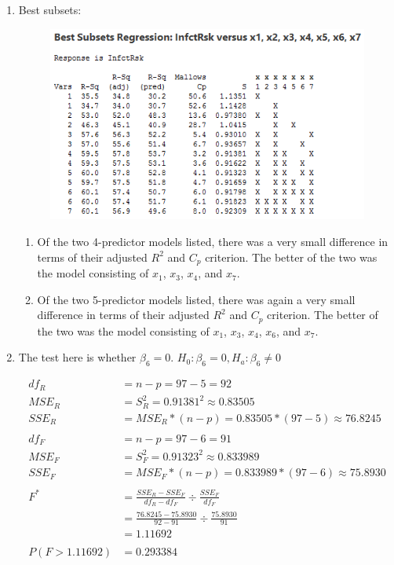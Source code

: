 \documentclass{article}
\providecommand{\tightlist}{%
      \setlength{\itemsep}{0pt}\setlength{\parskip}{0pt}}
\begin{document}
\begin{enumerate}
\def\labelenumi{\alph{enumi})}
\setcounter{enumi}{2}
\item
  Best subsets: \\
\begin{figure}[h!]
 \centering
 \includegraphics[scale=.6]{./images/best-subsets_regression.png}
\end{figure}


  \begin{enumerate}
  \def\labelenumii{\roman{enumii}.}
  \tightlist
  \item
    Of the two 4-predictor models listed, there was a very small
    difference in terms of their adjusted \(R^2\) and \(C_p\) criterion.
    The better of the two was the model consisting of \(x_1\), \(x_3\),
    \(x_4\), and \(x_7\).
  \item
    Of the two 5-predictor models listed, there was again a very small
    difference in terms of their adjusted \(R^2\) and \(C_p\) criterion.
    The better of the two was the model consisting of \(x_1\), \(x_3\),
    \(x_4\), \(x_6\), and \(x_7\).
  \end{enumerate}
\item
  The test here is whether \(\beta_6 = 0\).
  \(H_0: \beta_6 = 0, H_a: \beta_6 \ne 0\)

\begin{align*}
df_R &= n - p = 97 - 5 = 92 \\
MSE_R &= S_R^2 = 0.91381^2 \approx 0.83505 \\
SSE_R &= MSE_R * (n - p) = 0.83505 * (97 - 5) \approx 76.8245 \\
\\
df_F &= n - p = 97 - 6 = 91 \\ 
MSE_F &= S_F^2 = 0.91323^2 \approx 0.833989 \\
SSE_F &= MSE_F * (n - p) = 0.833989 * (97 - 6) \approx 75.8930 \\
\\
F^* &= \frac{SSE_R - SSE_F}{df_R - df_F} \div \frac{SSE_F}{df_F} \\
    &= \frac{76.8245 - 75.8930}{92 - 91} \div \frac{75.8930}{91} \\
    &= 1.11692 \\
    \\
P(F > 1.11692) &= 0.293384
\end{align*}


\end{enumerate}
\end{document}
